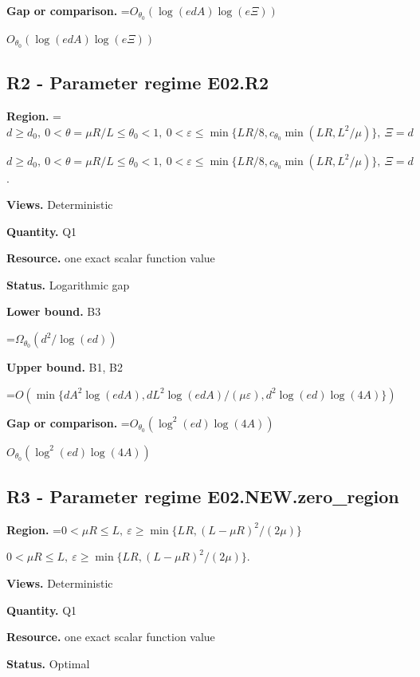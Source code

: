 \documentclass[10pt,a4paper]{article}
\newcommand{\AtlasMath}[1]{\par\begingroup\centering\setbox0=\hbox{$\displaystyle #1$}\ifdim\wd0>1.4\linewidth\typeout{ATLAS WIDE FORMULA: \the\wd0}\fi\ifdim\wd0>\linewidth\resizebox{\linewidth}{!}{\box0}\else\box0\fi\par\endgroup}
\newcommand{\AtlasInlineMath}[1]{\begingroup\setbox0=\hbox{$#1$}\ifdim\wd0>.4\linewidth\endgroup\AtlasMath{#1}\else\endgroup$#1$\fi}
\begin{document}
\textbf{Gap or comparison.} \AtlasInlineMath{O_{\theta_0}(\log(edA)\log(e\Xi))}



\subsection{R2 - Parameter regime E02.R2}


\textbf{Region.} \AtlasInlineMath{d\ge d_0,\ 0<\theta=\mu R/L\le\theta_0<1,\ 0<\varepsilon\le\min\{LR/8,c_{\theta_0}\min(LR,L^2/\mu)\},\ \Xi=d}.



\textbf{Views.} Deterministic



\textbf{Quantity.} Q1



\textbf{Resource.} one exact scalar function value



\textbf{Status.} Logarithmic gap



\textbf{Lower bound.} B3



\AtlasMath{\Omega_{\theta_0}(d^2/\log(ed))}


\textbf{Upper bound.} B1, B2



\AtlasMath{O(\min\{dA^2\log(edA),dL^2\log(edA)/(\mu\varepsilon),d^2\log(ed)\log(4A)\})}


\textbf{Gap or comparison.} \AtlasInlineMath{O_{\theta_0}(\log^2(ed)\log(4A))}



\subsection{R3 - Parameter regime E02.NEW.zero\_region}


\textbf{Region.} \AtlasInlineMath{0<\mu R\le L,\ \varepsilon\ge\min\{LR,(L-\mu R)^2/(2\mu)\}}.



\textbf{Views.} Deterministic



\textbf{Quantity.} Q1



\textbf{Resource.} one exact scalar function value



\textbf{Status.} Optimal
\end{document}
